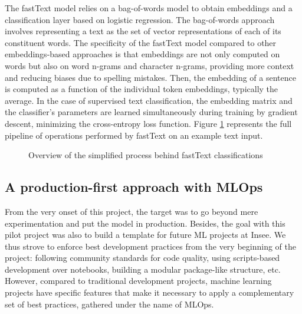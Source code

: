 \documentclass[graybox]{svmult}
\begin{document}
The fastText model relies on a bag-of-words model to obtain embeddings and a classification layer based on logistic regression. The bag-of-words approach involves representing a text as the set of vector representations of each of its constituent words. The specificity of the fastText model compared to other embeddings-based approaches is that embeddings are not only computed on words but also on word n-grams and character n-grams, providing more context and reducing biases due to spelling mistakes. Then, the embedding of a sentence is computed as a function of the individual token embeddings, typically the average. In the case of supervised text classification, the embedding matrix and the classifier's parameters are learned simultaneously during training by gradient descent, minimizing the cross-entropy loss function. Figure \ref{fig:fasttext} represents the full pipeline of operations performed by fastText on an example text input.

\begin{figure}[htbp]
    \centering
    \caption{Overview of the simplified process behind fastText classifications}
    \label{fig:fasttext}
\end{figure}






\subsection{A production-first approach with MLOps}

From the very onset of this project, the target was to go beyond mere experimentation and put the model in production. Besides, the goal with this pilot project was also to build a template for future ML projects at Insee. We thus strove to enforce best development practices from the very beginning of the project: following community standards for code quality, using scripts-based development over notebooks, building a modular package-like structure, etc. However, compared to traditional development projects, machine learning projects have specific features that make it necessary to apply a complementary set of best practices, gathered under the name of MLOps.
\end{document}
